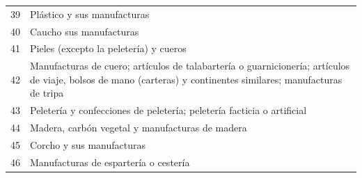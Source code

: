 \documentclass[a4paper,openright,12pt]{book}
\begin{document}
\begin{table}[]
{\begin{tabular}{@{}ll@{}}
    39  & Plástico y sus manufacturas                                                                                                                                                                                                                                                                    \\
    40  & Caucho sus manufacturas                                                                                                                                                                                                                                                                        \\
    41  & Pieles (excepto la peletería) y cueros                                                                                                                                                                                                                                                         \\
    42  & Manufacturas de cuero; artículos de talabartería o guarnicionería; artículos de viaje, bolsos de mano (carteras) y continentes similares; manufacturas de tripa                                                                                                                                \\
    43  & Peletería y confecciones de peletería; peletería facticia o artificial                                                                                                                                                                                                                         \\
    44  & Madera, carbón vegetal y manufacturas de madera                                                                                                                                                                                                                                                \\
    45  & Corcho y sus manufacturas                                                                                                                                                                                                                                                                      \\
    46  & Manufacturas de espartería o cestería                                                                                                                                                                                                                                                          \\

\end{tabular}}
\end{table}
\end{document}
